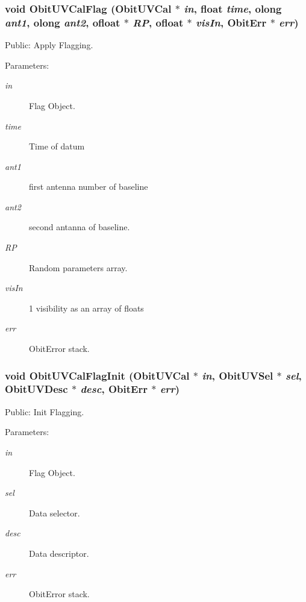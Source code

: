 \subsubsection{\setlength{\rightskip}{0pt plus 5cm}void Obit\-UVCal\-Flag ({\bf Obit\-UVCal} $\ast$ {\em in}, float {\em time}, {\bf olong} {\em ant1}, {\bf olong} {\em ant2}, {\bf ofloat} $\ast$ {\em RP}, {\bf ofloat} $\ast$ {\em vis\-In}, {\bf Obit\-Err} $\ast$ {\em err})}\label{ObitUVCalFlag_8c_a3}


Public: Apply Flagging. 

\begin{Desc}
\item[Parameters:]
\begin{description}
\item[{\em in}]Flag Object. \item[{\em time}]Time of datum \item[{\em ant1}]first antenna number of baseline \item[{\em ant2}]second antanna of baseline. \item[{\em RP}]Random parameters array. \item[{\em vis\-In}]1 visibility as an array of floats \item[{\em err}]Obit\-Error stack. \end{description}
\end{Desc}
\subsubsection{\setlength{\rightskip}{0pt plus 5cm}void Obit\-UVCal\-Flag\-Init ({\bf Obit\-UVCal} $\ast$ {\em in}, {\bf Obit\-UVSel} $\ast$ {\em sel}, {\bf Obit\-UVDesc} $\ast$ {\em desc}, {\bf Obit\-Err} $\ast$ {\em err})}\label{ObitUVCalFlag_8c_a2}


Public: Init Flagging. 

\begin{Desc}
\item[Parameters:]
\begin{description}
\item[{\em in}]Flag Object. \item[{\em sel}]Data selector. \item[{\em desc}]Data descriptor. \item[{\em err}]Obit\-Error stack. \end{description}
\end{Desc}
